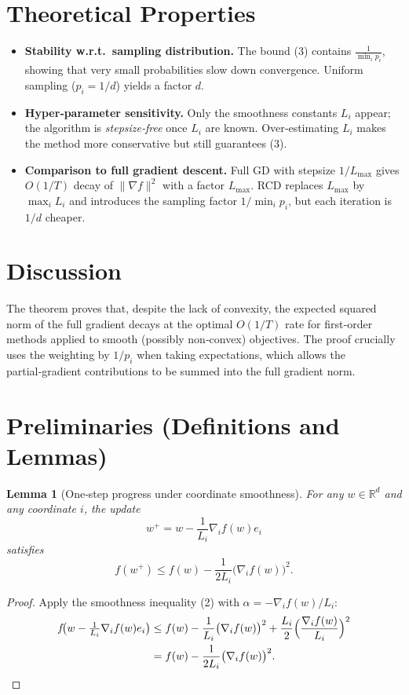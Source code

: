 \documentclass{article}
\newtheorem{lemma}{Lemma}
\newcommand{\R}{\mathbb{R}}
\begin{document}
\section*{Theoretical Properties}
\begin{itemize}
\item \textbf{Stability w.r.t.\ sampling distribution.} The bound (3) contains
$\displaystyle \frac{1}{\min_i p_i}$, showing that very small probabilities
slow down convergence. Uniform sampling ($p_i=1/d$) yields a factor $d$.
\item \textbf{Hyper‑parameter sensitivity.} Only the smoothness constants $L_i$
appear; the algorithm is \emph{stepsize‑free} once $L_i$ are known. Over‑estimating
$L_i$ makes the method more conservative but still guarantees (3).
\item \textbf{Comparison to full gradient descent.} Full GD with stepsize $1/L_{\max}$
gives $O(1/T)$ decay of $\|\nabla f\|^2$ with a factor $L_{\max}$. RCD replaces $L_{\max}$
by $\max_i L_i$ and introduces the sampling factor $1/\min_i p_i$, but each iteration
is $1/d$ cheaper.
\end{itemize}

\section*{Discussion}
The theorem proves that, despite the lack of convexity, the expected squared norm
of the full gradient decays at the optimal $O(1/T)$ rate for first‑order
methods applied to smooth (possibly non‑convex) objectives. The proof crucially
uses the weighting by $1/p_i$ when taking expectations, which allows the
partial‑gradient contributions to be summed into the full gradient norm.

\section*{Preliminaries (Definitions and Lemmas)}
\begin{lemma}[One‑step progress under coordinate smoothness]\label{lem:one-step}
For any $w\in\R^d$ and any coordinate $i$, the update
\[
w^{+}=w - \frac{1}{L_i}\nabla_i f(w) e_i
\]
satisfies
\[
f(w^{+}) \le f(w) - \frac{1}{2L_i}\bigl(\nabla_i f(w)\bigr)^2 .
\tag{4}
\]
\end{lemma}
\begin{proof}
Apply the smoothness inequality (2) with $\alpha=-\nabla_i f(w)/L_i$:
\[
\begin{aligned}
f\!\bigl(w-\tfrac{1}{L_i}\nabla_i f(w) e_i \bigr)
&\le f(w) -\frac{1}{L_i}\bigl(\nabla_i f(w)\bigr)^2
   + \frac{L_i}{2}\Bigl(\frac{\nabla_i f(w)}{L_i}\Bigr)^2    \\
&= f(w) - \frac{1}{2L_i}\bigl(\nabla_i f(w)\bigr)^2 .
\end{aligned}
\]
\end{proof}
\end{document}
